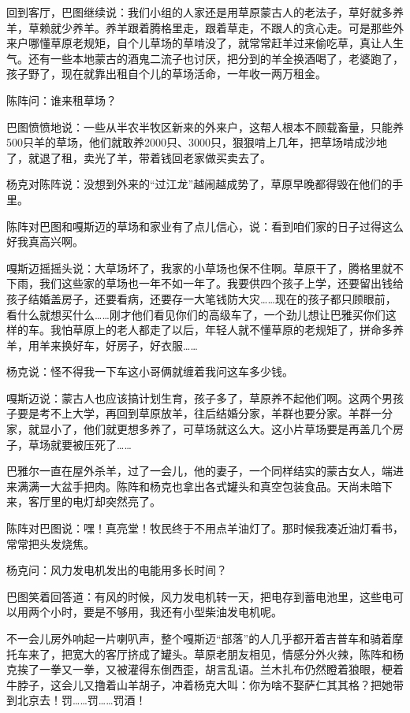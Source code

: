 \par 回到客厅，巴图继续说：我们小组的人家还是用草原蒙古人的老法子，草好就多养羊，草赖就少养羊。养羊跟着腾格里走，跟着草走，不跟人的贪心走。可是那些外来户哪懂草原老规矩，自个儿草场的草啃没了，就常常赶羊过来偷吃草，真让人生气。还有一些本地蒙古的酒鬼二流子也讨厌，把分到的羊全换酒喝了，老婆跑了，孩子野了，现在就靠出租自个儿的草场活命，一年收一两万租金。
\par 陈阵问：谁来租草场？
\par 巴图愤愤地说：一些从半农半牧区新来的外来户，这帮人根本不顾载畜量，只能养500只羊的草场，他们就敢养2000只、3000只，狠狠啃上几年，把草场啃成沙地了，就退了租，卖光了羊，带着钱回老家做买卖去了。
\par 杨克对陈阵说：没想到外来的“过江龙”越闹越成势了，草原早晚都得毁在他们的手里。
\par 陈阵对巴图和嘎斯迈的草场和家业有了点儿信心，说：看到咱们家的日子过得这么好我真高兴啊。
\par 嘎斯迈摇摇头说：大草场坏了，我家的小草场也保不住啊。草原干了，腾格里就不下雨，我们这些家的草场也一年不如一年了。我要供四个孩子上学，还要留出钱给孩子结婚盖房子，还要看病，还要存一大笔钱防大灾……现在的孩子都只顾眼前，看什么就想买什么……刚才他们看见你们的高级车了，一个劲儿想让巴雅买你们这样的车。我怕草原上的老人都走了以后，年轻人就不懂草原的老规矩了，拼命多养羊，用羊来换好车，好房子，好衣服……
\par 杨克说：怪不得我一下车这小哥俩就缠着我问这车多少钱。
\par 嘎斯迈说：蒙古人也应该搞计划生育，孩子多了，草原养不起他们啊。这两个男孩子要是考不上大学，再回到草原放羊，往后结婚分家，羊群也要分家。羊群一分家，就显小了，他们就更想多养了，可草场就这么大。这小片草场要是再盖几个房子，草场就要被压死了……
\par 巴雅尔一直在屋外杀羊，过了一会儿，他的妻子，一个同样结实的蒙古女人，端进来满满一大盆手把肉。陈阵和杨克也拿出各式罐头和真空包装食品。天尚未暗下来，客厅里的电灯却突然亮了。
\par 陈阵对巴图说：嘿！真亮堂！牧民终于不用点羊油灯了。那时候我凑近油灯看书，常常把头发烧焦。
\par 杨克问：风力发电机发出的电能用多长时间？
\par 巴图笑着回答道：有风的时候，风力发电机转一天，把电存到蓄电池里，这些电可以用两个小时，要是不够用，我还有小型柴油发电机呢。
\par 不一会儿房外响起一片喇叭声，整个嘎斯迈“部落”的人几乎都开着吉普车和骑着摩托车来了，把宽大的客厅挤成了罐头。草原老朋友相见，情感分外火辣，陈阵和杨克挨了一拳又一拳，又被灌得东倒西歪，胡言乱语。兰木扎布仍然瞪着狼眼，梗着牛脖子，这会儿又撸着山羊胡子，冲着杨克大叫：你为啥不娶萨仁其其格？把她带到北京去！罚……罚……罚酒！
